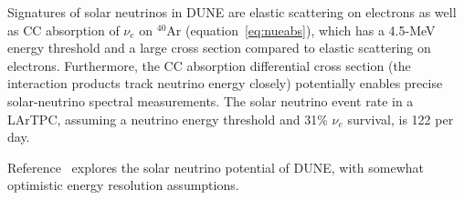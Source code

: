 Signatures of solar neutrinos in DUNE
are elastic scattering on electrons as well as CC absorption of $\nu_e$ on $^{40}$Ar (equation~\ref{eq:nueabs}), which has a 4.5-MeV energy threshold and a large cross section compared to elastic scattering on electrons.  Furthermore, the CC absorption differential cross section (the interaction products track neutrino energy closely) potentially enables precise solar-neutrino spectral measurements.
The solar neutrino event rate in a
 LArTPC, assuming a  neutrino energy
threshold and 31\% $\nu_e$ survival, is 122 per day.

Reference~\cite{Capozzi:2018dat} explores the solar neutrino potential
of DUNE, with somewhat optimistic energy resolution assumptions.







